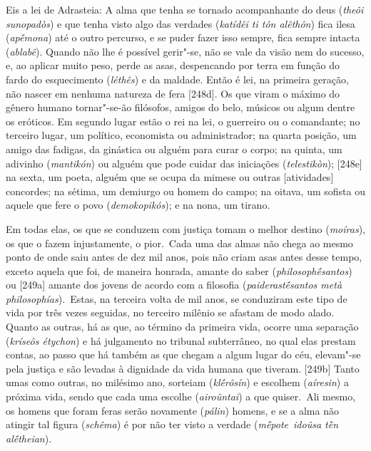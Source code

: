 Eis a lei de Adrasteia: A alma que tenha se tornado acompanhante do deus
(\emph{theôi sunopadòs}) e que tenha visto algo das verdades
(\emph{katídêi ti tôn alêthôn}) fica ilesa (\emph{apḗmona}) até o outro
percurso, e se puder fazer isso sempre, fica sempre intacta
(\emph{ablabê}). Quando não lhe é possível gerir"-se, não se vale da
visão nem do sucesso, e, ao aplicar muito peso, perde as asas,
despencando por terra em função do fardo do esquecimento (\emph{léthês})
e da maldade. Então é lei, na primeira geração, não nascer em nenhuma
natureza de fera [248d]. Os que viram o máximo do gênero humano
tornar"-se-ão filósofos, amigos do belo, músicos ou algum dentre os
eróticos. Em segundo lugar estão o rei na lei, o guerreiro ou o
comandante; no terceiro lugar, um político, economista ou administrador;
na quarta posição, um amigo das fadigas, da ginástica ou alguém para
curar o corpo; na quinta, um adivinho (\emph{mantikón}) ou alguém que
pode cuidar das iniciações (\emph{telestikòn}); [248e] na sexta, um
poeta, alguém que se ocupa da mimese ou outras [atividades]
concordes; na sétima, um demiurgo ou homem do campo; na oitava, um sofista
ou aquele que fere o povo (\emph{demokopikós}); e na nona, um tirano.

Em todas elas, os que se conduzem com justiça tomam o melhor destino
(\emph{moíras}), os que o fazem injustamente, o pior.~Cada uma das almas
não chega ao mesmo ponto de onde saiu antes de dez mil anos, pois não
criam asas antes desse tempo, exceto aquela que foi, de maneira honrada,
amante do saber (\emph{philosophḗsantos}) ou [249a] amante dos
jovens de acordo com a filosofia (\emph{paiderastḗsantos metà
philosophías}).\emph{~}Estas, na terceira volta de mil anos, se
conduziram este tipo de vida por três vezes seguidas, no terceiro
milênio se afastam de modo alado. Quanto as outras, há as que, ao término
da primeira vida, ocorre uma separação (\emph{kríseôs étychon}) e há
julgamento no tribunal subterrâneo, no qual elas prestam contas, ao
passo que há também as que chegam a algum lugar do céu, elevam"-se pela
justiça e são levadas à dignidade da vida humana que tiveram. [249b]
Tanto umas como outras, no milésimo ano, sorteiam (\emph{klḗrôsín}) e
escolhem (\emph{aíresin}) a próxima vida, sendo que cada uma escolhe
(\emph{airoûntai}) a que quiser.~Ali mesmo, os homens que foram feras
serão novamente (\emph{pálin}) homens, e se a alma não atingir tal
figura (\emph{schêma}) é por não ter visto a verdade
(\emph{mḗpote}~\emph{idoûsa tḕn alḗtheian}).

